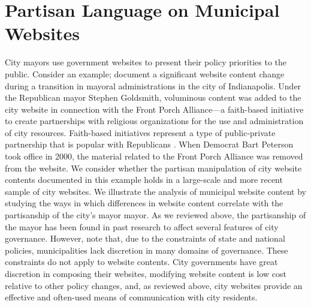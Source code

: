 \documentclass[11pt]{article}
\begin{document}
\section{Partisan Language on Municipal Websites}

City mayors use government websites to present their policy priorities to the public. Consider an example; \cite[p.55]{formicola2003faith} document a significant website content change during a transition in mayoral administrations in the city of Indianapolis. Under the Republican mayor Stephen Goldsmith, voluminous content was added to the city website in connection with the Front Porch Alliance---a faith-based initiative to create partnerships with religious organizations for the use and administration of city resources. Faith-based initiatives represent a type of public-private partnership that is popular with Republicans \citep{saperstein2003public}. When Democrat Bart Peterson took office in 2000, the material related to the Front Porch Alliance was removed from the website. We consider whether the partisan manipulation of city website contents documented in this example holds in a large-scale and more recent sample of city websites. We illustrate the analysis of municipal website content by studying the ways in which differences in website content correlate with the partisanship of the city's mayor mayor. As we reviewed above, the partisanship of the mayor has been found in past research to affect several features of city governance. However, \citet{gerber2011mayors} note that, due to the constraints of state and national policies, municipalities lack discretion in many domains of governance. These constraints do not apply to website contents. City governments have great discretion in composing their websites, modifying website content is low cost relative to other policy changes, and, as reviewed above, city websites provide an effective and often-used means of communication with city residents. 

\end{document}

